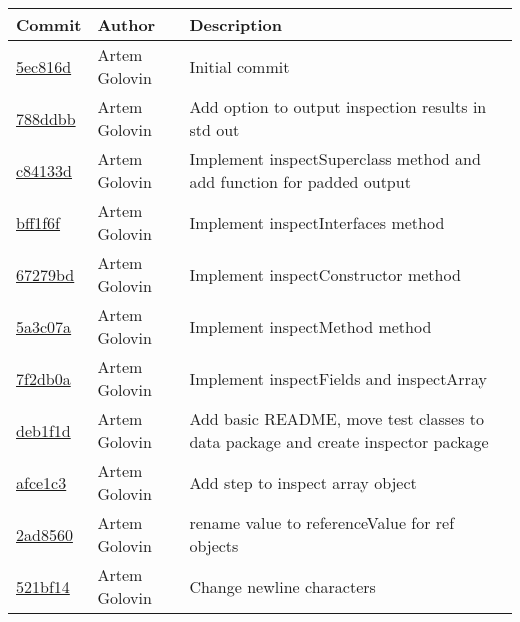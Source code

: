 \begin{tabularx}{\textwidth}{l l X}\textbf{Commit} & \textbf{Author} & \textbf{Description}\\ \hline
\href{https://github.com/awave1/assessment-loan-system/commit/5ec816dfc0e519d694f6da56351a2e67b482ec35}{5ec816d} & Artem Golovin & Initial commit\\ \hline
\href{https://github.com/awave1/assessment-loan-system/commit/788ddbb7111d9619e219ae982a252e425357aff6}{788ddbb} & Artem Golovin & Add option to output inspection results in std out\\ \hline
\href{https://github.com/awave1/assessment-loan-system/commit/c84133d93749d907509d9c70d27e74650d6b5c8c}{c84133d} & Artem Golovin & Implement inspectSuperclass method and add function for padded output\\ \hline
\href{https://github.com/awave1/assessment-loan-system/commit/bff1f6f712e252773a3f6a4327aed282ca731384}{bff1f6f} & Artem Golovin & Implement inspectInterfaces method\\ \hline
\href{https://github.com/awave1/assessment-loan-system/commit/67279bdb7cc979fa64b62ad9c3ce97f36f95b632}{67279bd} & Artem Golovin & Implement inspectConstructor method\\ \hline
\href{https://github.com/awave1/assessment-loan-system/commit/5a3c07a9a640ae8a964eae4e9eed72e891decf44}{5a3c07a} & Artem Golovin & Implement inspectMethod method\\ \hline
\href{https://github.com/awave1/assessment-loan-system/commit/7f2db0a58396b9fd2ede3c2b26ffe62950d598d2}{7f2db0a} & Artem Golovin & Implement inspectFields and inspectArray\\ \hline
\href{https://github.com/awave1/assessment-loan-system/commit/deb1f1de7e5fc16777c9b73706129ce39fdea906}{deb1f1d} & Artem Golovin & Add basic README, move test classes to data package and create inspector package\\ \hline
\href{https://github.com/awave1/assessment-loan-system/commit/afce1c33fb3eec7439dee533fa24dfd92e970780}{afce1c3} & Artem Golovin & Add step to inspect array object\\ \hline
\href{https://github.com/awave1/assessment-loan-system/commit/2ad85609a71571066644866f9107f99da4ae5166}{2ad8560} & Artem Golovin & rename value to referenceValue for ref objects\\ \hline
\href{https://github.com/awave1/assessment-loan-system/commit/521bf14c5b22ec50dd1e98daf4cb436209d49a3f}{521bf14} & Artem Golovin & Change newline characters\\ \hline

\end{tabularx}
